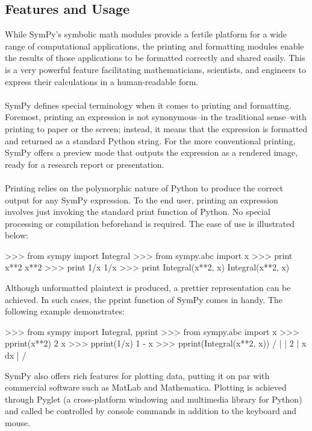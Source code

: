 \documentclass[11pt,a4paper,oneside]{report}
\begin{document}
\subsection*{Features and Usage}
While SymPy’s symbolic math modules provide a fertile platform for a wide range of computational applications, the printing and formatting modules enable the results of those applications to be formatted correctly and shared easily. This is a very powerful feature facilitating mathematicians, scientists, and engineers to express their calculations in a human-readable form.\\\\
SymPy defines special terminology when it comes to printing and formatting. Foremost, printing an expression is not synonymous–in the traditional sense–with printing to paper or the screen; instead, it means that the expression is formatted and returned as a standard Python string. For the more conventional printing, SymPy offers a preview mode that outputs the expression as a rendered image, ready for a research report or presentation.\\\\
Printing relies on the polymorphic nature of Python to produce the correct output for any SymPy expression. To the end user, printing an expression involves just invoking the standard print function of Python. No special processing or compilation beforehand is required. The ease of use is illustrated below:
\begin{verbatimtab}
>>> from sympy import Integral
>>> from sympy.abc import x
>>> print x**2
x**2
>>> print 1/x
1/x
>>> print Integral(x**2, x)
Integral(x**2, x)
\end{verbatimtab}
Although unformatted plaintext is produced, a prettier representation can be achieved. In such cases, the pprint function of SymPy comes in handy. The following example demonstrates:
\begin{verbatimtab}
>>> from sympy import Integral, pprint
>>> from sympy.abc import x
>>> pprint(x**2)
 2
x
>>> pprint(1/x)
1
-
x
>>> pprint(Integral(x**2, x))
  /
  |
  |  2
  | x  dx
  |
 /
\end{verbatimtab}
SymPy also offers rich features for plotting data, putting it on par with commercial software such as MatLab and Mathematica. Plotting is achieved through Pyglet (a cross-platform windowing and multimedia library for Python) and called be controlled by console commands in addition to the keyboard and mouse.\\\\
\end{document}
